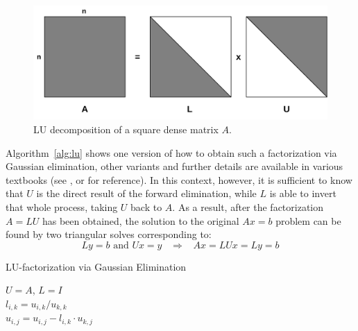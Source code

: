 \begin{figure}[h]
    \centering
    \includegraphics[width=0.75\linewidth]{figures/lu.pdf}
    \caption{LU decomposition of a square dense matrix $A$.}
    \label{fig:lu_decomposition}
\end{figure}

\noindent Algorithm~\hyperref[alg:lu]{\ref{alg:lu}} shows one version of how to obtain such a factorization via Gaussian elimination, other variants and further details are available in various textbooks (see \cite{strang_introduction_2009}, \cite{golub_matrix_2013} or \cite{singh_linear_2014} for reference). In this context, however, it is sufficient to know that $U$ is the direct result of the forward elimination, while $L$ is able to invert that whole process, taking $U$ back to $A$. As a result, after the factorization $A=LU$ has been obtained, the solution to the original $Ax=b$ problem can be found by two triangular solves corresponding to:
\begin{equation}
    Ly=b \text{ and } Ux=y 	\;\;\; \Rightarrow \;\;\; Ax=LUx=Ly=b
\end{equation}

\begin{algorithm}[h]
  \caption{LU-factorization via Gaussian Elimination}
  \label{alg:lu}
  \SetAlgoLined
  $U=A$, $L=I$ \\
   {
     {
      $l_{i, k} = u_{i, k} / u_{k, k}$ \\
       {
        $u_{i, j} = u_{i, j} - l_{i, k} \cdot u_{k,j}$
      }
    }
  }
\end{algorithm}

